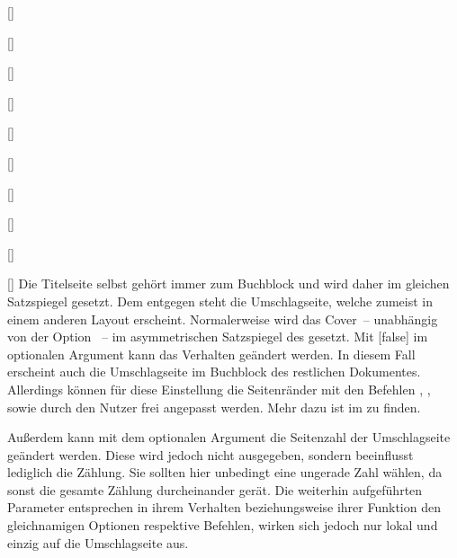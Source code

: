 \begin{Declaration*}{}
\begin{Declaration*}{}
\begin{Declaration*}{}
\begin{Declaration}
\begin{Declaration}[v2.02]{%
  []%
}
\begin{Declaration}{[\PBoolean]}
\begin{Declaration}[v2.02]{[\PSet]}{%
}
\begin{Declaration}[v2.03]{[\PSet]}{%
}
\begin{Declaration}[v2.03]{[\PSet]}{%
}
\begin{Declaration}[v2.03]{%
  []%
}{}
\begin{Declaration}[v2.03]{%
  []
}{}
\begin{Declaration}[v2.03]{[\PSet]}{%
}
\begin{Declaration}[v2.03]{[\PSet]}{%
}
\begin{Declaration}[v2.03]{[\PSet]}{%
}
Die Titelseite selbst gehört immer zum Buchblock und wird daher im gleichen 
Satzspiegel gesetzt. Dem entgegen steht die Umschlagseite, welche zumeist in 
einem anderen Layout erscheint. Normalerweise wird das Cover~-- unabhängig von 
der Option ~-- im asymmetrischen Satzspiegel des \CDs 
gesetzt. Mit [false] im optionalen Argument 
kann das Verhalten geändert werden. In diesem Fall erscheint auch die 
Umschlagseite im Buchblock des restlichen Dokumentes. Allerdings können für 
diese Einstellung die Seitenränder mit den Befehlen , 
,  sowie 
 durch den Nutzer frei angepasst werden. Mehr dazu 
ist im \scrguide zu finden.

Außerdem kann mit dem optionalen Argument die Seitenzahl der Umschlagseite 
geändert werden. Diese wird jedoch nicht ausgegeben, sondern beeinflusst 
lediglich die Zählung. Sie sollten hier unbedingt eine ungerade Zahl wählen, da 
sonst die gesamte Zählung durcheinander gerät. Die weiterhin aufgeführten 
Parameter entsprechen in ihrem Verhalten beziehungsweise ihrer Funktion den 
gleichnamigen Optionen respektive Befehlen, wirken sich jedoch nur lokal und 
einzig auf die Umschlagseite aus.
\end{Declaration}
\end{Declaration}
\end{Declaration}
\end{Declaration}
\end{Declaration}
\end{Declaration}
\end{Declaration}
\end{Declaration}
\end{Declaration}
\end{Declaration}
\end{Declaration}
%


\end{Declaration*}
\end{Declaration*}
\end{Declaration*}
